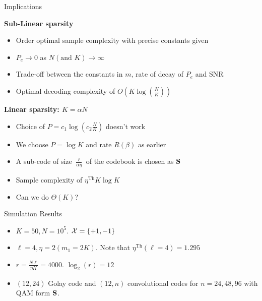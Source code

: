 \begin{frame}{Implications}
\begin{description}
    \item[\textbf{Sub-Linear sparsity}]
\end{description}
\begin{itemize}
\item Order optimal sample complexity with precise constants given
\item $P_e\rightarrow 0$ as $N (\text{and } K)\rightarrow \infty$
\item Trade-off between the constants in $m$, rate of decay of  $P_e$ and SNR
\item Optimal decoding complexity of $O\left(K\log\left(\frac{N}{K}\right)\right)$
\end{itemize}
\pause
\vspace{2ex}
\begin{description}
    \item [\textbf{Linear sparsity: $K=\alpha N$}]
\end{description}
\begin{itemize}
\item Choice of $P=c_{1}\log\left(c_2 \frac{N}{K}\right)$ doesn't work
\item We choose $P=\log K$ and rate $R(\beta)$ as earlier
\item A sub-code of size $\frac{\ell}{\alpha\eta}$ of the codebook is chosen as $\mathbf{S}$
\item Sample complexity of $\eta^{\text{Th}}K\log K$
\item Can we do $\Theta(K)$?
\end{itemize}
\end{frame}

\begin{frame}{Simulation Results}
\begin{itemize}
\item $K=50, N=10^5$. $\mathcal{X}=\{+1,-1\}$
\item $\ell=4, \eta =2 (m_1 =2K)$. Note that $\eta^{\text{Th}}(\ell=4)=1.295$
\item $r=\frac{N\ell}{\eta K}=4000$. $\log_2(r)=12$
\item $(12,24)$ Golay code and $(12,n)$ convolutional codes for $n=24,48,96$ with QAM form $\mathbf{S}$.
\end{itemize}

\begin{figure}
\resizebox{0.55\textwidth}{!}{
\begin{centering}

\end{centering}
}
\end{figure}
\end{frame}


